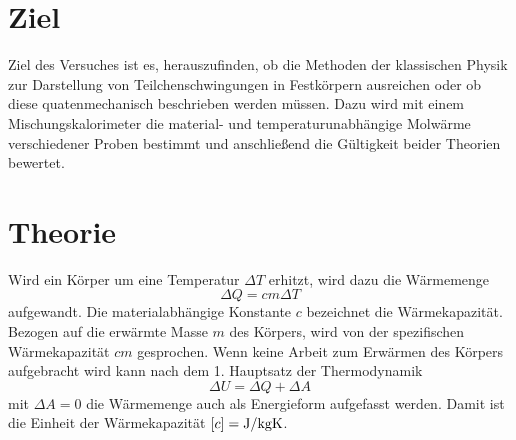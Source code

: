 \section{Ziel}

Ziel des Versuches ist es, herauszufinden, ob die Methoden der klassischen Physik zur Darstellung von Teilchenschwingungen in Festkörpern ausreichen oder ob diese quatenmechanisch beschrieben werden müssen. Dazu wird mit einem Mischungskalorimeter die material- und temperaturunabhängige Molwärme verschiedener Proben bestimmt und anschließend die Gültigkeit beider Theorien bewertet.
\section{Theorie}
\label{sec:Theorie}

Wird ein Körper  um eine Temperatur $\Delta{T}$ erhitzt, wird dazu die Wärmemenge 
\begin{equation}
\Delta{Q}=c m \Delta{T}
\label{eq:waermekapazitaet}
\end{equation}
aufgewandt. Die materialabhängige Konstante $c$ bezeichnet die Wärmekapazität. Bezogen auf die erwärmte Masse $m$ des Körpers, wird von der spezifischen Wärmekapazität $cm$ gesprochen.
Wenn keine Arbeit zum Erwärmen des Körpers aufgebracht wird kann nach dem 1. Hauptsatz der Thermodynamik
\begin{equation}
	\Delta{U}=\Delta{Q}+\Delta{A}
	\label{eq:hs_1}
\end{equation}
mit $\Delta{A}=0$ die Wärmemenge auch als Energieform aufgefasst werden. Damit ist die Einheit der Wärmekapazität $[c]=\si{\joule\per{\kilo\gram\kelvin}}$.

